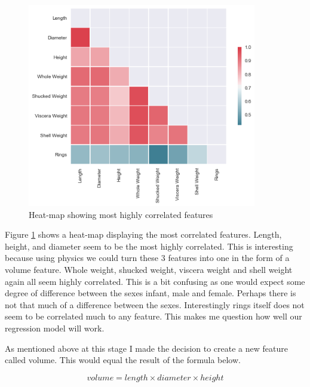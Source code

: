 \begin{figure}[H]
  \centering
  \includegraphics[scale=0.5,width=100mm]{./images/abalone-heatmap.png}
  \caption{Heat-map showing most highly correlated features}
  \label{fig:abalones-heatmap}
\end{figure}

Figure \ref{fig:abalones-heatmap} shows a heat-map displaying the most correlated features. Length, height, and diameter seem to be the most highly correlated. This is interesting because using physics we could turn these 3 features into one in the form of a volume feature. Whole weight, shucked weight, viscera weight and shell weight again all seem highly correlated. This is a bit confusing as one would expect some degree of difference between the sexes infant, male and female. Perhaps there is not that much of a difference between the sexes. Interestingly rings itself does not seem to be correlated much to any feature. This makes me question how well our regression model will work. 

As mentioned above at this stage I made the decision to create a new feature called volume. This would equal the result of the formula below.

\begin{equation}
    volume = length \times diameter \times height
\end{equation}